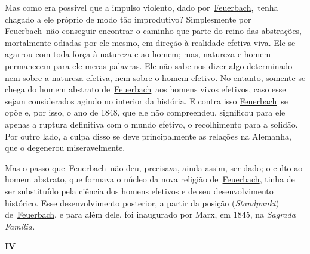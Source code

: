 Mas como era possível que a impulso violento, dado
por~\href{https://www.marxists.org/portugues/dicionario/verbetes/f/feuerbach.htm}{Feuerbach},~tenha
chagado a ele próprio de modo tão improdutivo? Simplesmente por
\href{https://www.marxists.org/portugues/dicionario/verbetes/f/feuerbach.htm}{Feuerbach}~não
conseguir encontrar o caminho que parte do reino das abstrações,
mortalmente odiadas por ele mesmo, em direção à realidade efetiva viva.
Ele se agarrou com toda força à natureza e ao homem; mas, natureza e
homem permanecem para ele meras palavras. Ele não sabe nos dizer algo
determinado nem sobre a natureza efetiva, nem sobre o homem efetivo. No
entanto, somente se chega do homem abstrato
de~\href{https://www.marxists.org/portugues/dicionario/verbetes/f/feuerbach.htm}{Feuerbach}~aos
homens vivos efetivos, caso esse sejam considerados agindo no interior
da história. E contra isso
\href{https://www.marxists.org/portugues/dicionario/verbetes/f/feuerbach.htm}{Feuerbach}~se
opõe e, por isso, o ano de 1848, que ele não compreendeu, significou
para ele apenas a ruptura definitiva com o mundo efetivo, o recolhimento
para a solidão. Por outro lado, a culpa disso se deve principalmente as
relações na Alemanha, que o degenerou miseravelmente.

Mas o passo
que~\href{https://www.marxists.org/portugues/dicionario/verbetes/f/feuerbach.htm}{Feuerbach}~não
deu, precisava, ainda assim, ser dado; o culto ao homem abstrato, que
formava o núcleo da nova religião
de~\href{https://www.marxists.org/portugues/dicionario/verbetes/f/feuerbach.htm}{Feuerbach},
tinha de ser substituído pela ciência dos homens efetivos e de seu
desenvolvimento histórico. Esse desenvolvimento posterior, a partir da
posição (\emph{Standpunkt})
de~\href{https://www.marxists.org/portugues/dicionario/verbetes/f/feuerbach.htm}{Feuerbach},
e para além dele, foi inaugurado por Marx, em 1845, na \emph{Sagrada
Família.}

\textbf{IV}

